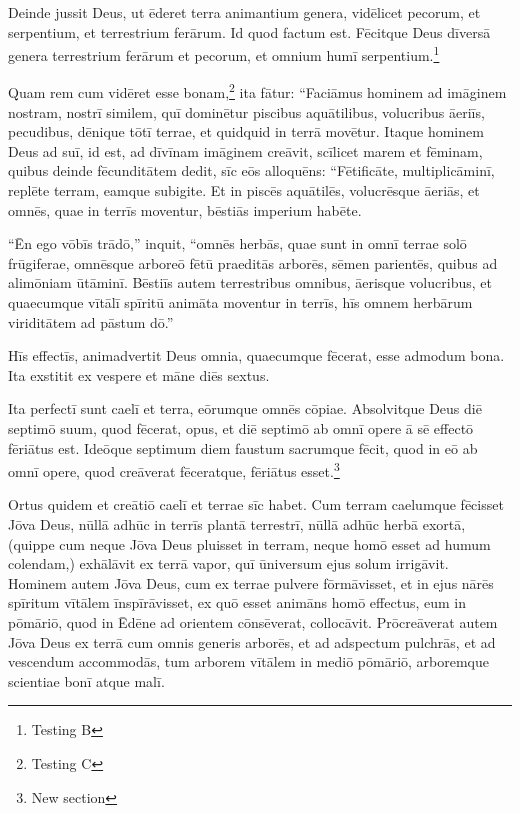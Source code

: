 \Versus Deinde jussit Deus, ut ēderet terra animantium genera, vidēlicet pecorum, et serpentium, et terrestrium ferārum. Id quod factum est.
\Versus Fēcitque Deus dīversā genera terrestrium ferārum et pecorum, et omnium humī serpentium.\footnote{Testing B}


Quam rem cum vidēret esse bonam,\footnote{Testing C}
\Versus ita fātur: ``Faciāmus hominem ad imāginem nostram, nostrī similem, quī dominētur piscibus aquātilibus, volucribus āeriīs, pecudibus, dēnique tōtī terrae, et quidquid in terrā movētur.
\Versus Itaque hominem Deus ad suī, id est, ad dīvīnam imāginem creāvit, scīlicet marem et fēminam,
\Versus quibus deinde fēcunditātem dedit, sīc eōs alloquēns: ``Fētificāte, multiplicāminī, replēte terram, eamque subigite. Et in piscēs aquātilēs, volucrēsque āeriās, et omnēs, quae in terrīs moventur, bēstiās imperium habēte.

\Versus ``Ēn ego vōbīs trādō,'' inquit, ``omnēs herbās, quae sunt in omnī terrae solō frūgiferae, omnēsque arboreō fētū praeditās arborēs, sēmen parientēs, quibus ad alimōniam ūtāminī.
\Versus Bēstiīs autem terrestribus omnibus, āerisque volucribus, et quaecumque vītālī spīritū animāta moventur in terrīs, hīs omnem herbārum viriditātem ad pāstum dō.''

\Versus Hīs effectīs, animadvertit Deus omnia, quaecumque fēcerat, esse admodum bona. Ita exstitit ex vespere et māne diēs sextus.



\Caput
\Versus Ita perfectī sunt caelī et terra, eōrumque omnēs cōpiae.
\Versus Absolvitque Deus diē septimō suum, quod fēcerat, opus, et diē septimō ab omnī opere ā sē effectō fēriātus est.
\Versus Ideōque septimum diem faustum sacrumque fēcit, quod in eō ab omnī opere, quod creāverat fēceratque, fēriātus esset.\footnote{New section}


\Versus Ortus quidem et creātiō caelī et terrae sīc habet. Cum terram caelumque fēcisset Jōva Deus,
\Versus nūllā adhūc in terrīs plantā terrestrī, nūllā adhūc herbā exortā, (quippe cum neque Jōva Deus pluisset in terram, neque homō esset ad humum colendam,)
\Versus exhālāvit ex terrā vapor, quī ūniversum ejus solum irrigāvit.
\Versus Hominem autem Jōva Deus, cum ex terrae pulvere fōrmāvisset, et in ejus nārēs spīritum vītālem īnspīrāvisset, ex quō esset animāns homō effectus,
\Versus eum in pōmāriō, quod in Ēdēne ad orientem cōnsēverat, collocāvit.
\Versus Prōcreāverat autem Jōva Deus ex terrā cum omnis generis arborēs, et ad adspectum pulchrās, et ad vescendum accommodās, tum arborem vītālem in mediō pōmāriō, arboremque scientiae bonī atque malī.

